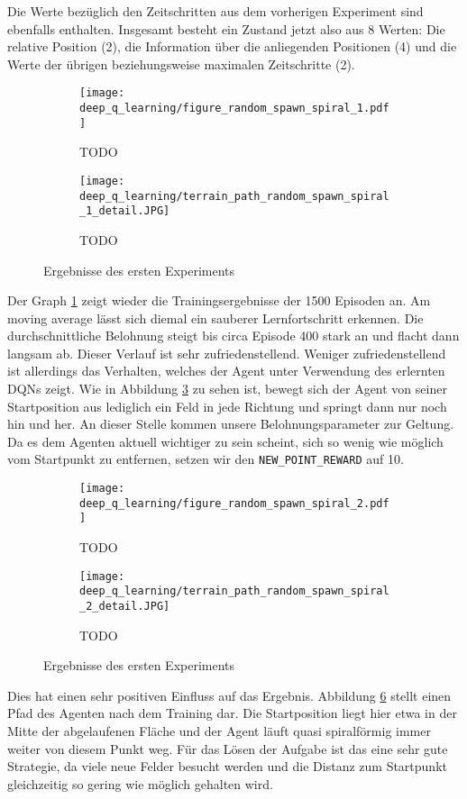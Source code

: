 Die Werte bezüglich den Zeitschritten aus dem vorherigen Experiment sind ebenfalls enthalten. Insgesamt besteht ein Zustand jetzt also aus 8 Werten: Die relative Position (2), die Information über die anliegenden Positionen (4) und die Werte der übrigen beziehungsweise maximalen Zeitschritte (2).
\begin{figure}[H]
    \centering
    \begin{subfigure}[b]{0.59\textwidth}
        \texttt{[image: deep\_q\_learning/figure\_random\_spawn\_spiral\_1.pdf]}
        \caption{TODO}
        \label{img:graphDeepQRandomSpawnSpiral1}
    \end{subfigure}
    \begin{subfigure}[b]{0.4\textwidth}
        \texttt{[image: deep\_q\_learning/terrain\_path\_random\_spawn\_spiral\_1\_detail.JPG]}
        \caption{TODO}
        \label{img:pathDeepQRandomSpawnSpiral1}
    \end{subfigure}
    \caption{Ergebnisse des ersten Experiments}
\end{figure}
Der Graph \ref{img:graphDeepQRandomSpawnSpiral1} zeigt wieder die Trainingsergebnisse der 1500 Episoden an. Am moving average lässt sich diemal ein sauberer Lernfortschritt erkennen. Die durchschnittliche Belohnung steigt bis circa Episode 400 stark an und flacht dann langsam ab. Dieser Verlauf ist sehr zufriedenstellend. Weniger zufriedenstellend ist allerdings das Verhalten, welches der Agent unter Verwendung des erlernten DQNs zeigt. Wie in Abbildung \ref{img:pathDeepQRandomSpawnSpiral1} zu sehen ist, bewegt sich der Agent von seiner Startposition aus lediglich ein Feld in jede Richtung und springt dann nur noch hin und her.
An dieser Stelle kommen unsere Belohnungsparameter zur Geltung. Da es dem Agenten aktuell wichtiger zu sein scheint, sich so wenig wie möglich vom Startpunkt zu entfernen, setzen wir den \texttt{NEW_POINT_REWARD} auf 10.
\begin{figure}[H]
    \centering
    \begin{subfigure}[b]{0.59\textwidth}
        \texttt{[image: deep\_q\_learning/figure\_random\_spawn\_spiral\_2.pdf]}
        \caption{TODO}
        \label{img:graphDeepQRandomSpawnSpiral2}
    \end{subfigure}
    \begin{subfigure}[b]{0.4\textwidth}
        \texttt{[image: deep\_q\_learning/terrain\_path\_random\_spawn\_spiral\_2\_detail.JPG]}
        \caption{TODO}
        \label{img:pathDeepQRandomSpawnSpiral2}
    \end{subfigure}
    \caption{Ergebnisse des ersten Experiments}
\end{figure}
Dies hat einen sehr positiven Einfluss auf das Ergebnis. Abbildung \ref{img:pathDeepQRandomSpawnSpiral2} stellt einen Pfad des Agenten nach dem Training dar. Die Startposition liegt hier etwa in der Mitte der abgelaufenen Fläche und der Agent läuft quasi spiralförmig immer weiter von diesem Punkt weg. Für das Lösen der Aufgabe ist das eine sehr gute Strategie, da viele neue Felder besucht werden und die Distanz zum Startpunkt gleichzeitig so gering wie möglich gehalten wird.

